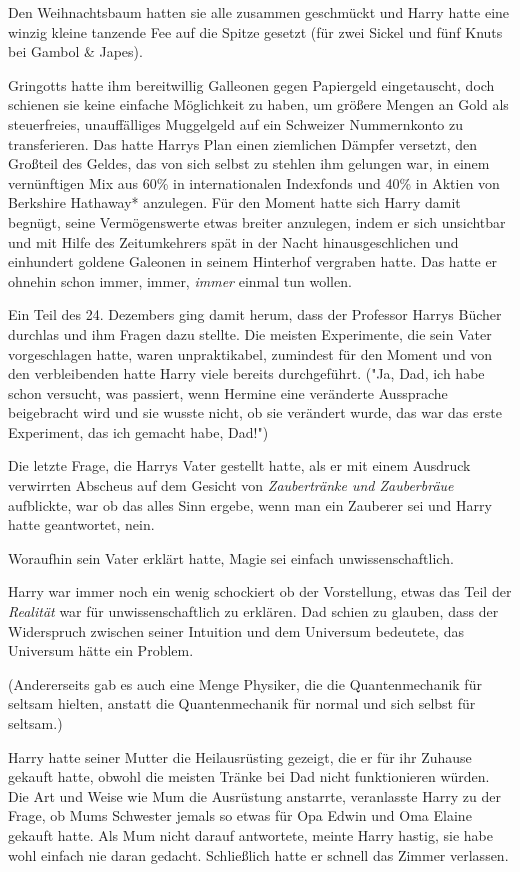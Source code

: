{Den Weihnachtsbaum hatten sie alle zusammen geschmückt und Harry hatte eine winzig kleine tanzende Fee auf die Spitze gesetzt (für zwei Sickel und fünf Knuts bei Gambol \& Japes).

Gringotts hatte ihm bereitwillig Galleonen gegen Papiergeld eingetauscht, doch schienen sie keine einfache Möglichkeit zu haben, um größere Mengen an Gold als steuerfreies, unauffälliges Muggelgeld auf ein Schweizer Nummernkonto zu transferieren. Das hatte Harrys Plan einen ziemlichen Dämpfer versetzt, den Großteil des Geldes, das von sich selbst zu stehlen ihm gelungen war, in einem vernünftigen Mix aus 60\% in internationalen Indexfonds und 40\% in Aktien von Berkshire Hathaway* anzulegen. Für den Moment hatte sich Harry damit begnügt, seine Vermögenswerte etwas breiter anzulegen, indem er sich unsichtbar und mit Hilfe des Zeitumkehrers spät in der Nacht hinausgeschlichen und einhundert goldene Galeonen in seinem Hinterhof vergraben hatte. Das hatte er ohnehin schon immer, immer, \emph{immer} einmal tun wollen.

Ein Teil des 24. Dezembers ging damit herum, dass der Professor Harrys Bücher durchlas und ihm Fragen dazu stellte. Die meisten Experimente, die sein Vater vorgeschlagen hatte, waren unpraktikabel, zumindest für den Moment und von den verbleibenden hatte Harry viele bereits durchgeführt. ("Ja, Dad, ich habe schon versucht, was passiert, wenn Hermine eine veränderte Aussprache beigebracht wird und sie wusste nicht, ob sie verändert wurde, das war das erste Experiment, das ich gemacht habe, Dad!")

Die letzte Frage, die Harrys Vater gestellt hatte, als er mit einem Ausdruck verwirrten Abscheus auf dem Gesicht von \emph{Zaubertränke und Zauberbräue} aufblickte, war ob das alles Sinn ergebe, wenn man ein Zauberer sei und Harry hatte geantwortet, nein.

Woraufhin sein Vater erklärt hatte, Magie sei einfach unwissenschaftlich.

Harry war immer noch ein wenig schockiert ob der Vorstellung, etwas das Teil der \emph{Realität} war für unwissenschaftlich zu erklären. Dad schien zu glauben, dass der Widerspruch zwischen seiner Intuition und dem Universum bedeutete, das Universum hätte ein Problem.

(Andererseits gab es auch eine Menge Physiker, die die Quantenmechanik für seltsam hielten, anstatt die Quantenmechanik für normal und sich selbst für seltsam.)

Harry hatte seiner Mutter die Heilausrüsting gezeigt, die er für ihr Zuhause gekauft hatte, obwohl die meisten Tränke bei Dad nicht funktionieren würden. Die Art und Weise wie Mum die Ausrüstung anstarrte, veranlasste Harry zu der Frage, ob Mums Schwester jemals so etwas für Opa Edwin und Oma Elaine gekauft hatte. Als Mum nicht darauf antwortete, meinte Harry hastig, sie habe wohl einfach nie daran gedacht. Schließlich hatte er schnell das Zimmer verlassen.

}
